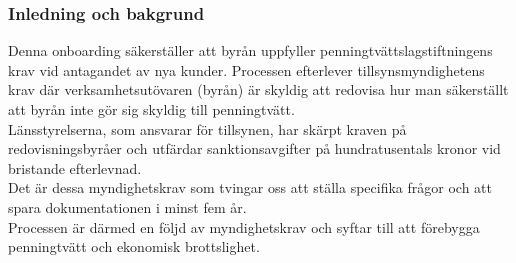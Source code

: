 \documentclass[10pt]{beamer}
\begin{document}
%
%
%
%
%
%

\begin{frame}[label=intro]
  \frametitle{Inledning och bakgrund}

  \small
  Denna onboarding säkerställer att byrån uppfyller penningtvättslagstiftningens krav vid antagandet av nya kunder. Processen efterlever tillsynsmyndighetens krav där verksamhetsutövaren (byrån) är skyldig att redovisa hur man säkerställt att byrån inte gör sig skyldig till penningtvätt.\\
  Länsstyrelserna, som ansvarar för tillsynen, har skärpt kraven på redovisningsbyråer och utfärdar sanktionsavgifter på hundratusentals kronor vid bristande efterlevnad.\\
  Det är dessa myndighetskrav som tvingar oss att ställa specifika frågor och att spara dokumentationen i minst fem år.\\
  Processen är därmed en följd av myndighetskrav och syftar till att förebygga penningtvätt och ekonomisk brottslighet.

  \vspace{1.2cm}
  \begin{flushright}
    \hyperlink{nextslide}{}
  \end{flushright}
\end{frame}
\end{document}
